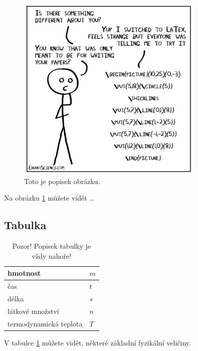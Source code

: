 \begin{figure}[htpb]
    \centering
    \includegraphics[width=0.8\textwidth]{img/LaTex-1024x1024.png}
    \caption{Toto je popisek obrázku.}
    \label{fig:o_latexu} %
\end{figure}

Na obrázku \ref{fig:o_latexu} můžete vidět \ldots






\subsection{Tabulka}

\begin{table}[htpb]
\centering
\caption{Pozor! Popisek tabulky je vždy nahoře!} 
\label{tab:SI_veliciny}
\renewcommand{\arraystretch}{1.2} %
\begin{tabular}{|l|l|}
\hline 
hmotnost    & $m$ \\ 
\hline 
čas         & $t$ \\ 
\hline 
délka       & $s$ \\ 
\hline 
látkové množství & $n$  \\ 
\hline 
termodynamická teplota & $T$ \\ 
\hline 
\end{tabular}
\end{table}

V tabulce \ref{tab:SI_veliciny} můžete vidět, některé základní fyzikální veličiny.























